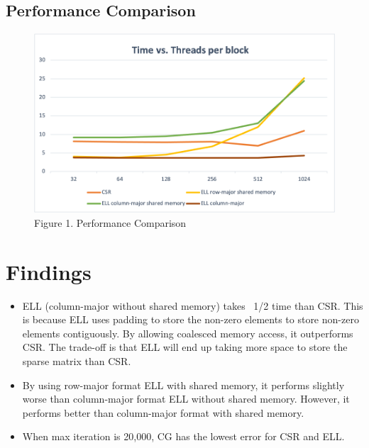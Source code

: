 \documentclass[a4paper,11pt,BCOR10mm,oneside,headsepline]{scrartcl}
\begin{document}
		\newpage
		\subsection{Performance Comparison}
		\begin{figure}[!htbp]
			\centering
			\includegraphics[scale=0.6]{plot}
			\caption*{Figure 1. Performance Comparison}
		\end{figure}
		
	\section{Findings}
		\begin{itemize}
			\item ELL (column-major without shared memory) takes ~1/2 time than CSR. This is because ELL uses padding to store the non-zero elements to store non-zero elements contiguously. By allowing coalesced memory access, it outperforms CSR. The trade-off is that ELL will end up taking more space to store the sparse matrix than CSR.
			\item By using row-major format ELL with shared memory, it performs slightly worse than column-major format ELL without shared memory. However, it performs better than column-major format with shared memory.
			\item When max iteration is 20,000, CG has the lowest error for CSR and ELL. 
		\end{itemize}
	
\end{document}
